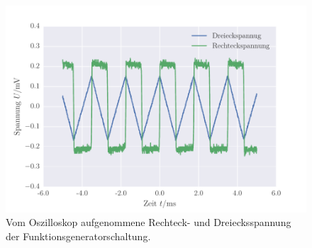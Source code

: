 \FloatBarrier
\begin{figure}[!h]
\centering
\includegraphics[scale=1]{../Grafiken/Funktionsgenerator.pdf}
\caption{Vom Oszilloskop aufgenommene Rechteck- und Dreiecksspannung der Funktionsgeneratorschaltung.\label{fig:funktionsgenerator}}
\end{figure}
\FloatBarrier